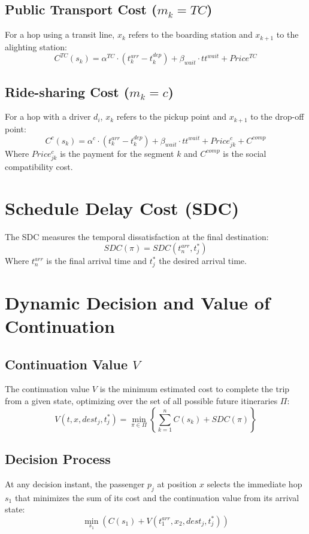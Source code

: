 \documentclass[12pt,a4paper]{article}
\begin{document}
\subsection{Public Transport Cost ($m_k = TC$)}
For a hop using a transit line, $x_k$ refers to the boarding station and $x_{k+1}$ to the alighting station:
\[ C^{TC}(s_k) = \alpha^{TC} \cdot (t_k^{arr} - t_k^{dep}) + \beta_{wait} \cdot tt^{wait} + Price^{TC} \]

\subsection{Ride-sharing Cost ($m_k = c$)}
For a hop with a driver $d_i$, $x_k$ refers to the pickup point and $x_{k+1}$ to the drop-off point:
\[ C^c(s_k) = \alpha^c \cdot (t_k^{arr} - t_k^{dep}) + \beta_{wait} \cdot tt^{wait} + Price^c_{jk} + C^{comp} \]
Where $Price^c_{jk}$ is the payment for the segment $k$ and $C^{comp}$ is the social compatibility cost.

\section{Schedule Delay Cost (SDC)}
The SDC measures the temporal dissatisfaction at the final destination:
\[ SDC(\pi) = SDC(t_n^{arr}, t^*_j) \]
Where $t_n^{arr}$ is the final arrival time and $t^*_j$ the desired arrival time.

\section{Dynamic Decision and Value of Continuation}

\subsection{Continuation Value $V$}
The continuation value $V$ is the minimum estimated cost to complete the trip from a given state, optimizing over the set of all possible future itineraries $\Pi$:
\[ V(t, x, dest_j, t^*_j) = \min_{\pi \in \Pi} \left\{ \sum_{k=1}^n C(s_k) + SDC(\pi) \right\} \]

\subsection{Decision Process}
At any decision instant, the passenger $p_j$ at position $x$ selects the immediate hop $s_1$ that minimizes the sum of its cost and the continuation value from its arrival state:
\[ \min_{s_1} \left( C(s_1) + V(t_1^{arr}, x_2, dest_j, t^*_j) \right) \]
\end{document}

